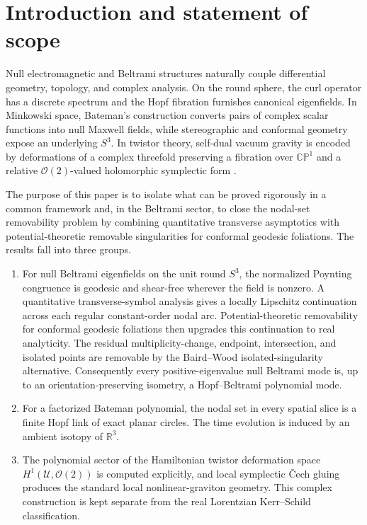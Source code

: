 \documentclass[aps,prd,reprint,nofootinbib,superscriptaddress]{revtex4-2}
\theoremstyle{definition}
\theoremstyle{remark}
\newcommand{\R}{\mathbb{R}}
\newcommand{\CP}{\mathbb{CP}}
\newcommand{\cO}{\mathcal{O}}
\newcommand{\cU}{\mathcal{U}}
\begin{document}
\maketitle

\section{Introduction and statement of scope}

Null electromagnetic and Beltrami structures naturally couple differential geometry, topology, and complex analysis. On the round sphere, the curl operator has a discrete spectrum and the Hopf fibration furnishes canonical eigenfields. In Minkowski space, Bateman's construction converts pairs of complex scalar functions into null Maxwell fields, while stereographic and conformal geometry expose an underlying $S^3$. In twistor theory, self-dual vacuum gravity is encoded by deformations of a complex threefold preserving a fibration over $\CP^1$ and a relative $\cO(2)$-valued holomorphic symplectic form \cite{Penrose1976,HitchinKarlhede1987}.

The purpose of this paper is to isolate what can be proved rigorously in a common framework and, in the Beltrami sector, to close the nodal-set removability problem by combining quantitative transverse asymptotics with potential-theoretic removable singularities for conformal geodesic foliations. The results fall into three groups.

\begin{enumerate}
\item For null Beltrami eigenfields on the unit round $S^3$, the normalized Poynting congruence is geodesic and shear-free wherever the field is nonzero. A quantitative transverse-symbol analysis gives a locally Lipschitz continuation across each regular constant-order nodal arc. Potential-theoretic removability for conformal geodesic foliations then upgrades this continuation to real analyticity. The residual multiplicity-change, endpoint, intersection, and isolated points are removable by the Baird--Wood isolated-singularity alternative. Consequently every positive-eigenvalue null Beltrami mode is, up to an orientation-preserving isometry, a Hopf--Beltrami polynomial mode.
\item For a factorized Bateman polynomial, the nodal set in every spatial slice is a finite Hopf link of exact planar circles. The time evolution is induced by an ambient isotopy of $\R^3$.
\item The polynomial sector of the Hamiltonian twistor deformation space $H^1(\cU,\cO(2))$ is computed explicitly, and local symplectic \v{C}ech gluing produces the standard local nonlinear-graviton geometry. This complex construction is kept separate from the real Lorentzian Kerr--Schild classification.
\end{enumerate}
\end{document}

